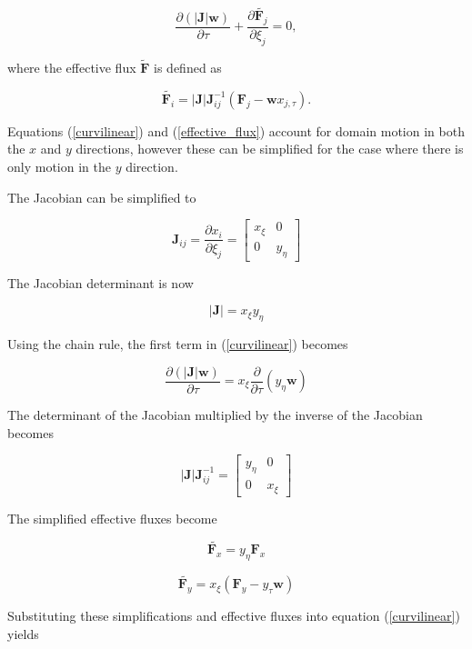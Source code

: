 \documentclass[10pt]{article}
\begin{document}
	\begin{equation} \label{curvilinear}
		\frac{\partial (|\mathbf{J}| \mathbf{w})}{\partial \tau} + \frac{\partial \tilde{\mathbf{F}_j}}{\partial \xi_j} = 0,
	\end{equation}
	
	where the effective flux $\tilde{\mathbf{F}}$ is defined as
	
	\begin{equation} \label{effective_flux}
		\tilde{\mathbf{F}_i} = |\mathbf{J}| \mathbf{J}_{ij}^{-1}(\mathbf{F}_j - \mathbf{w}x_{j,\tau}).
	\end{equation}
		
	 Equations (\ref{curvilinear}) and (\ref{effective_flux}) account for domain motion in both the $x$ and $y$ directions, however these can be simplified for the case where there is only motion in the $y$ direction.
	 
	 The Jacobian can be simplified to
	 
	 $$
	 \mathbf{\mathbf{J}}_{ij} = \frac{\partial x_i}{\partial \xi_j} = 
	 \begin{bmatrix}
	 	x_\xi & 0 \\
	 	0 & y_\eta
	 \end{bmatrix}
	$$
	
	The Jacobian determinant is now
	
	$$
	|\mathbf{J}| = x_\xi y_\eta
	$$
	 
	 Using the chain rule, the  first term in (\ref{curvilinear}) becomes
	 
	 $$
	 \frac{\partial (|\mathbf{J}| \mathbf{w})}{\partial \tau} = x_\xi \frac{\partial}{\partial \tau} \left( y_\eta \mathbf{w} \right)
	 $$
	 
	 The determinant of the Jacobian multiplied by the inverse of the Jacobian becomes
	 
	 $$
	 |\mathbf{J}| \mathbf{J}_{ij}^{-1} = 
	 \begin{bmatrix}
	 	y_\eta & 0 \\
	 	0 & x_\xi
	 \end{bmatrix}
	 $$
	 
	 The simplified effective fluxes become
	 
	 $$ \tilde{\mathbf{F}_x} = y_\eta \mathbf{F}_x $$
	 
	 $$ \tilde{\mathbf{F}_y}= x_\xi (\mathbf{F}_y - y_\tau \mathbf{w}) $$
	 
	 Substituting these simplifications and effective fluxes into equation (\ref{curvilinear}) yields
	 
\end{document}
